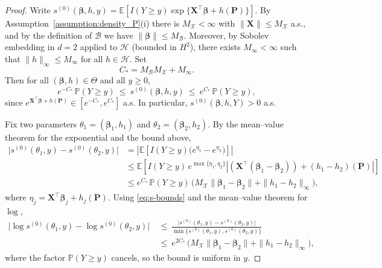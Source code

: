 \documentclass[10pt,a4paper]{amsart}
\begin{document}
     \begin{proof}
    Write $s^{(0)}(\bm\beta,h,y)=\mathbb E\!\left[I(Y\ge y)\exp\{\bm X^{\!\top}\bm\beta+h(\bm P)\}\right]$.
    By Assumption~\ref{assumption:density_P}(i) there is $M_{\mathcal X}<\infty$ with
    $\|\bm X\|\le M_{\mathcal X}$ a.s., and by the definition of $\mathcal B$ we have
    $\|\bm\beta\|\le M_{\mathcal B}$. Moreover, by Sobolev embedding in $d=2$
    applied to $\mathcal H$ (bounded in $H^2$), there exists $M_\infty<\infty$ such that
    $\|h\|_\infty\le M_\infty$ for all $h\in\mathcal H$. Set
    \[
    C_*=M_{\mathcal B}M_{\mathcal X}+M_\infty.
    \]
    Then for all $(\bm\beta,h)\in\Theta$ and all $y\ge 0$,
    \begin{equation}\label{eq:s-bounds}
    e^{-C_*}\,\mathbb P(Y\ge y)\ \le\ s^{(0)}(\bm\beta,h,y)\ \le\ e^{C_*}\,\mathbb P(Y\ge y),
    \end{equation}
    since $e^{\bm X^\top\bm\beta+h(\bm P)}\in[e^{-C_*},e^{C_*}]$ a.s.  In particular,
    $s^{(0)}(\bm\beta,h,Y)>0$ a.s.
    
    Fix two parameters $\theta_1=(\bm\beta_1,h_1)$ and $\theta_2=(\bm\beta_2,h_2)$.
    By the mean–value theorem for the exponential and the bound above,
    \[
    \begin{aligned}
    \big|s^{(0)}(\theta_1,y)-s^{(0)}(\theta_2,y)\big|
    &= \left|\mathbb E\!\left[I(Y\ge y)\big(e^{\eta_1}-e^{\eta_2}\big)\right]\right| \\
    &\le \mathbb E\!\left[I(Y\ge y)\,e^{\max\{\eta_1,\eta_2\}}
    \left|(\bm X^\top(\bm\beta_1-\bm\beta_2))+(h_1-h_2)(\bm P)\right|\right] \\
    &\le e^{C_*}\,\mathbb P(Y\ge y)\,\big(M_{\mathcal X}\|\bm\beta_1-\bm\beta_2\|
    +\|h_1-h_2\|_\infty\big),
    \end{aligned}
    \]
    where $\eta_j=\bm X^\top\bm\beta_j+h_j(\bm P)$.
    Using \eqref{eq:s-bounds} and the mean–value theorem for $\log$,
    \begin{align*}
    \big|\log s^{(0)}(\theta_1,y)-\log s^{(0)}(\theta_2,y)\big|
    \ &\le\ \frac{\big|s^{(0)}(\theta_1,y)-s^{(0)}(\theta_2,y)\big|}
    {\min\{s^{(0)}(\theta_1,y),s^{(0)}(\theta_2,y)\}}\\
    \ &\le\ e^{2C_*}\,\big(M_{\mathcal X}\|\bm\beta_1-\bm\beta_2\|
    +\|h_1-h_2\|_\infty\big),
    \end{align*}
    where the factor $\mathbb P(Y\ge y)$ cancels, so the bound is uniform in $y$.
    

\end{proof}
\end{document}
